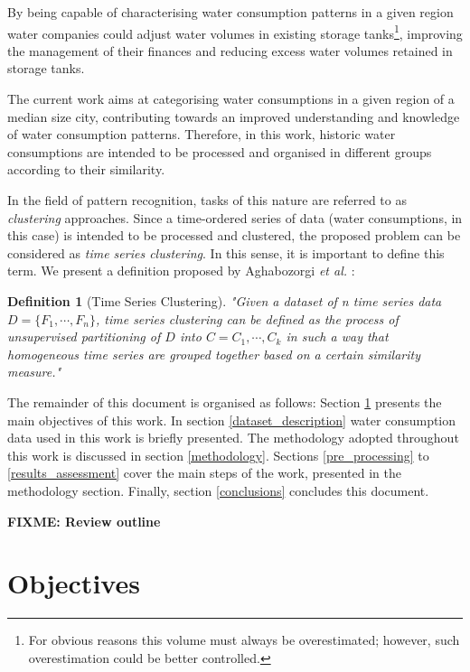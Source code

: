 \documentclass[9pt,journal,compsoc]{IEEEtran}
\newtheorem{mydef}{Definition}
\begin{document}
By being capable of characterising water consumption patterns in a given region water companies could adjust water volumes in existing storage tanks\footnote{For obvious reasons this volume must always be overestimated; however, such overestimation could be better controlled.}, improving the management of their finances and reducing excess water volumes retained in storage tanks.

The current work aims at categorising water consumptions in a given region of a median size city, contributing towards an improved understanding and knowledge of water consumption patterns. Therefore, in this work, historic water consumptions are intended to be processed and organised in different groups according to their similarity.

In the field of pattern recognition, tasks of this nature are referred to as \emph{clustering} approaches. Since a time-ordered series of data (water consumptions, in this case) is intended to be processed and clustered, the proposed problem can be considered as \emph{time series clustering}. In this sense, it is important to define this term. We present a definition proposed by Aghabozorgi \emph{et al.} \cite{aghabozorgi2015time}:

\begin{mydef}[Time Series Clustering]
	"Given a dataset of n time series data $D = \{F_{1}, \cdots , F_{n}\}$, time series clustering can be defined as the process of unsupervised partitioning of $D$ into $C = {C_{1}, \cdots , C_{k}}$ in such a way that homogeneous time series are grouped together based on a certain similarity measure."
\end{mydef}

The remainder of this document is organised as follows: Section \ref{objectives} presents the main objectives of this work. In section \ref{dataset_description} water consumption data used in this work is briefly presented. The methodology adopted throughout this work is discussed in section \ref{methodology}. Sections \ref{pre_processing} to \ref{results_assessment} cover the main steps of the work, presented in the methodology section. Finally, section \ref{conclusions} concludes this document.

\textbf{FIXME: Review outline}

\section{Objectives}
\label{objectives}
\end{document}

